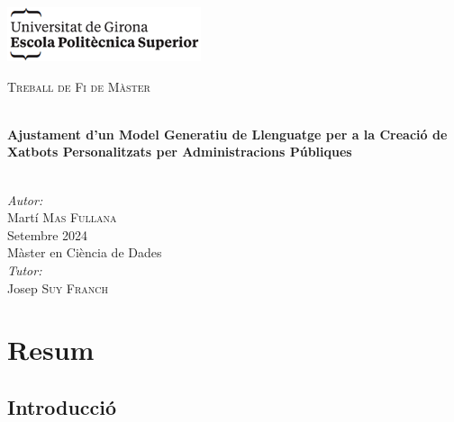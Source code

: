 \documentclass[a4paper,12pt,oneside]{ThesisStyle}
\begin{document}
\frontmatter


\hypersetup{pageanchor=false}
\begin{titlepage}

  \includegraphics[scale=0.9]{img/logo_eps.png} \\[1cm]
  \begin{center}
    \textsc{\Large Treball de Fi de Màster} \\[1cm]

    \begin{spacing}{2}
      \HRule \\
      \textbf{\Huge Ajustament d'un Model Generatiu de Llenguatge per a la Creació de Xatbots Personalitzats per Administracions Públiques} \\
      \HRule \\[0.5cm]
    \end{spacing}

    {
    \large
    \emph{Autor:} \\
    Martí \textsc{Mas Fullana} \\[1cm]
    Setembre 2024 \\[1cm]
    Màster en Ciència de Dades \\[1cm]
    \emph{Tutor:} \\
    Josep \textsc{Suy Franch} \\
    }

  \end{center}
\end{titlepage}
\hypersetup{pageanchor=true}

\titlepage



\mainmatter

\chapter{Resum}
\label{cap:summary}

\section{Introducció}
\label{sec:introduction}
\end{document}
